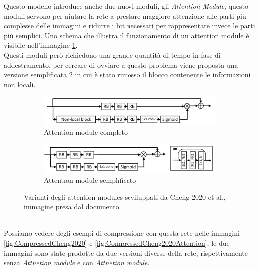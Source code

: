 Questo modello introduce anche due nuovi moduli, gli \textit{Attention Module}, questo moduli servono per aiutare la rete a prestare maggiore attenzione alle parti più complesse delle immagini e ridurre i bit necessari per rappresentare invece le parti più semplici. Uno schema che illustra il funzionamento di un attention module è visibile nell’immagine \ref{fig:cheng2020AttnModuleA}.\\
Questi moduli però richiedono una grande quantità di tempo in fase di addestramento, per cercare di ovviare a questo problema viene proposta una versione semplificata \ref{fig:cheng2020AttnModuleB} in cui è stato rimosso il blocco contenente le informazioni non locali.\\
\begin{figure}[h!]
    \centering
    \begin{subfigure}[]{0.6\textwidth}
        \includegraphics[width=\textwidth]{Immagini/Cheng2020_AttnModuleA.png}
        \caption{Attention module completo}
        \label{fig:cheng2020AttnModuleA}
    \end{subfigure}
    \vspace*{1.5cm}
    \begin{subfigure}[]{0.6\textwidth}
        \includegraphics[width=\textwidth]{Immagini/Cheng2020_AttnModuleB.png}
        \caption{Attention module semplificato}
        \label{fig:cheng2020AttnModuleB}
    \end{subfigure}
    \caption{Varianti degli attention modules scviluppati da Cheng 2020 et al., immagine presa dal documento \cite{cheng2020learned}}
    \label{fig:cheng2020AttnModule}
\end{figure}\\
Possiamo vedere degli esempi di compressione con questa rete nelle immagini \ref{fig:CompressedCheng2020} e \ref{fig:CompressedCheng2020Attention}, le due immagini sono state prodotte da due versioni diverse della rete, rispettivamente senza \textit{Attnetion module} e con \textit{Attnetion module}.\\
\newpage

